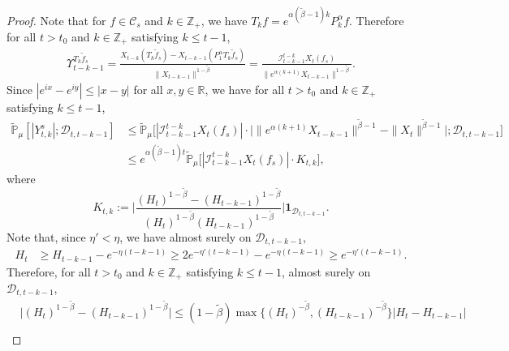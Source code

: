 \documentclass[12pt,a4paper]{amsart}
\theoremstyle{plain}
\theoremstyle{definition}
\numberwithin{equation}{section}
\begin{document}
\begin{proof}
  Note that for $f\in \mathcal C_s$ and $k\in \mathbb Z_+$, we have $T_kf = e^{\alpha (\tilde \beta - 1 )k}P_k^\alpha f $. Therefore for all $t>t_0$ and $k\in \mathbb Z_+$ satisfying $k\leq t-1$,
  \begin{align}
    \label{eq:gammafunction11}
    \Upsilon_{t-k-1}^{T_{k} \tilde f_s}
    = \frac{X_{t-k}(T_{k} \tilde  f_s) - X_{t -k-1}(P_1^\alpha T_{k} \tilde f_s)}{\|X_{t-k-1}\|^{1-\tilde \beta}}
    = \frac{\mathcal I_{t - k - 1}^{t - k} X_t(f_s)}{\|e^{\alpha (k+1)}X_{t-k-1} \|^{1 -\tilde \beta}}.
  \end{align}
  Since $|e^{ix}-e^{iy}|\leq|x-y|$ for all $x,y\in \mathbb R$, we have  for all $t>t_0$ and $k\in \mathbb Z_+$ satisfying $k\leq t-1$,
  \begin{align}
    \label{eq: control of Ykt}
    \mathbb{\widetilde{P}}_{\mu}[|Y^s_{t,k}|;\mathcal{D}_{t,t-k-1}]
    & \leq \mathbb{\widetilde{P}}_{\mu}\Big[|\mathcal I_{t-k-1}^{t-k} X_t(f_s) | \cdot \Big| \| e^{\alpha(k+1)}X_{t-k-1}\| ^{ \tilde \beta - 1} - \|X_t\|^{ \tilde \beta - 1}\Big|; \mathcal D_{t,t-k-1}\Big] \\
    & \leq  e^{\alpha(\tilde \beta - 1)t}\mathbb{\widetilde{P}}_{\mu}\big[|\mathcal I_{t-k-1}^{t-k}X_t(f_s)|\cdot K_{t,k}\big],
  \end{align}
  where
  \[
    K_{t,k}
   := \Big| \frac {(H_t)^{1- \tilde \beta} - (H_{t-k-1})^{1 - \tilde \beta}} {(H_t)^{1 - \tilde \beta}
   (H_{t-k-1})^{ 1- \tilde \beta }} \Big| \mathbf{1}_{\mathcal{D}_{t,t-k-1}}.
  \]
  Note that, since $\eta' < \eta$, we have almost surely on $\mathcal D_{t,t-k-1}$,
  \begin{align}
    H_t
    & \geq H_{t-k-1}- e^{-\eta (t-k-1)}
      \geq 2e^{-\eta'(t-k-1)}-e^{-\eta(t-k-1)}
      \geq e^{-\eta'(t-k-1)}.
  \end{align}
  Therefore, for all $t>t_0$ and $k\in \mathbb Z_+$ satisfying $k\leq t-1$, almost surely  on $\mathcal D_{t,t-k-1}$,
  \begin{align}
   & \Big|(H_t)^{1- \tilde \beta}-(H_{t-k-1})^{1- \tilde \beta}\Big|
      \leq (1- \tilde \beta) \max \{ (H_t)^{-\tilde \beta }, (H_{t-k-1})^{ -\tilde \beta} \} | H_t - H_{t-k-1} | \\

\end{align}
\end{proof}
\end{document}
